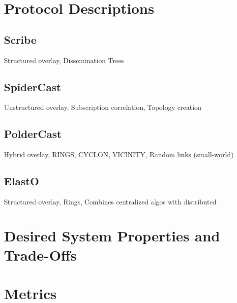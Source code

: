 \documentclass[UKenglish, a4paper]{ifimaster}
\begin{document}
\chapter{Protocol Descriptions}
\label{ch:protocol-descriptions}
\section{Scribe}
Structured overlay, Dissemination Trees
\section{SpiderCast}
Unstructured overlay, Subscription correlation, Topology creation
\section{PolderCast}
Hybrid overlay, RINGS, CYCLON, VICINITY, Random links (small-world)
\section{ElastO}
Structured overlay, Rings, Combines centralized algos with distributed

\chapter{Desired System Properties and Trade-Offs}
\label{ch:desired-system-properties-and-trade-offs}


\chapter{Metrics}
\label{ch:metrics}

\end{document}
